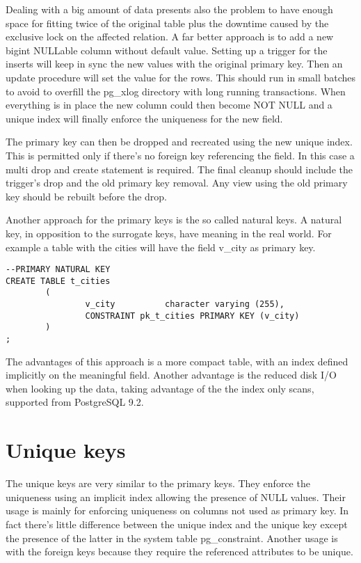 Dealing with a big amount of data presents also the problem to have enough space for fitting twice 
of the original table plus the downtime caused by the exclusive lock on the affected relation. A 
far better approach is to add a new bigint NULLable column without default value. Setting up a 
trigger for the inserts will keep in sync the new values with the original primary key. Then an 
update procedure will set the value for the rows. This should run in small batches to avoid to 
overfill the pg\_xlog directory with long running transactions. When everything is in place the new 
column could then become NOT NULL and a unique index will finally enforce the uniqueness for the 
new 
field. \newline

The primary key can then be dropped and recreated using the new unique index. This is permitted 
only if there's no foreign key referencing the field. In this case a multi drop and create 
statement is required. The final cleanup should include the trigger's drop and the old primary key 
removal. Any view using the old primary key should be rebuilt before the drop.\newline

Another approach for the primary keys is the so called natural keys. A natural key, in opposition 
to the surrogate keys, have meaning in the real world. For example a table with the cities will 
have the field v\_city as primary key. 

\begin{lstlisting}[style=pgsql]
--PRIMARY NATURAL KEY 
CREATE TABLE t_cities
        (
                v_city          character varying (255),
                CONSTRAINT pk_t_cities PRIMARY KEY (v_city)
        )
;
\end{lstlisting}

The advantages of this approach is a more compact table, with an index defined implicitly on the 
meaningful field. Another advantage is the reduced disk I/O when looking up the data, taking 
advantage of the the index only scans, supported from PostgreSQL 9.2.


\section{Unique keys}
The unique keys are very similar to the primary keys. They enforce the uniqueness using an implicit 
index allowing the presence of NULL values. Their usage is mainly for enforcing uniqueness on 
columns not used as primary key. In fact there's little difference between the unique index and the 
unique key except the presence of the latter in the system table pg\_constraint. Another usage 
is with the foreign keys because they require the referenced attributes to be unique. 
\newpage

